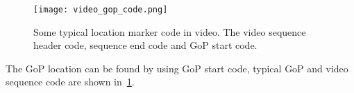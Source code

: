 \begin{figure}[!htbp]
  \centering
  \begin{minipage}{1.0\columnwidth}
  \texttt{[image: video\_gop\_code.png]}
  \end{minipage}
  
  \vspace{-1ex}
  \caption
    {
    \small
    Some typical location marker code in video. The video sequence header code,
    sequence end code and GoP start code. 
    }
  \label{fig:video_gop_code}
\end{figure}

The GoP location can be found by using GoP start code, typical GoP and video
sequence code are shown in~\fig\ref{fig:video_gop_code}. 

